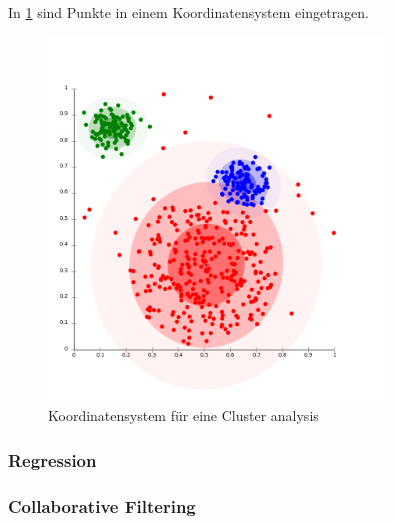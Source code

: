 In \cref{fig:recherche:dataminingtechniken:disziplinen:clusteranalysis} sind Punkte in einem Koordinatensystem eingetragen.
\begin{figure}[H]
	\RawFloats
	\centering
	\includegraphics[width=0.8\textwidth]{images/clusteranalysis.png}
	\caption{Koordinatensystem für eine Cluster analysis}
	\label{fig:recherche:dataminingtechniken:disziplinen:clusteranalysis}
\end{figure}

%

\subsubsection{Regression}

\subsubsection{Collaborative Filtering}